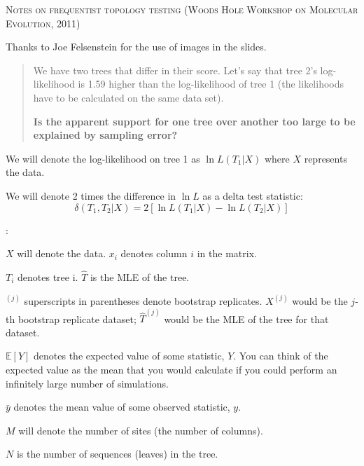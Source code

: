 \documentclass[11pt]{article}
\renewcommand{\section}[2]{%
\bigskip
\begin{center}
\begin{Large}
\normalfont\scshape #2
\medskip
\end{Large}
\end{center}}
\renewcommand{\subsection}[1]{%
\noindent{\large\scshape \underline{#1}}:}
\newcommand{\lnL}{\ln L}
\newcommand{\expectation}{{\mathbb{E}}}
\newcommand{\expect}[1]{\expectation\left[#1\right]}
\begin{document}
\section*{Notes on frequentist topology testing (Woods Hole Workshop on Molecular Evolution, 2011)}
Thanks to Joe Felsenstein for the use of images in the slides.

\begin{quote}
	We have two  trees that differ in their score. 
	Let's say that tree 2's log-likelihood is 1.59 higher than the log-likelihood of tree 1 (the likelihoods have to be calculated on the same data set).
	
	{\bf Is the apparent support for one tree over another too large to be explained by sampling error?}
	
\end{quote}

We will denote the log-likelihood on tree 1 as $\lnL(T_1|X)$ where $X$ represents the data.

We will denote 2 times the difference in $\lnL$ as a delta test statistic: $$\delta(T_1,T_2|X) = 2\left[\ln L(T_1|X) - \ln L(T_2|X)\right]$$

\subsection{Notation}
\begin{compactitem}
	\item $X$ will denote the data. $x_i$ denotes column $i$ in the matrix.\\
	\item $T_i$ denotes tree i. $\hat{T}$ is the MLE of the tree. \\
	\item $^{(j)}$ superscripts in parentheses denote bootstrap replicates. $X^{(j)}$ would be the $j$-th bootstrap replicate dataset; $\hat{T}^{(j)}$ would be the MLE of the tree for that dataset.\\
	\item $\expect{Y}$ denotes the expected value of some statistic, $Y$.  You can think of the expected value as the mean that you would calculate if you could perform an infinitely large number of simulations.
	\item $\bar y$ denotes the mean value of some observed statistic, $y$.
	\item $M$ will denote the number of sites (the number of columns).
	\item $N$ is the number of sequences (leaves) in the tree.
\end{compactitem}
\end{document}
